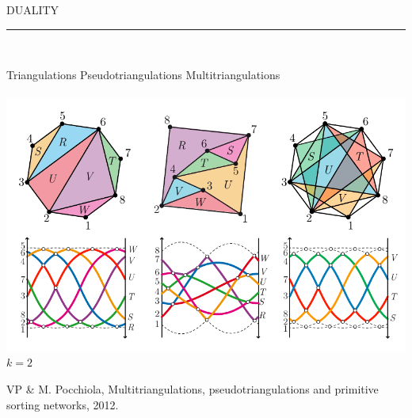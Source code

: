 \documentclass[12pt,titlepage,landscape,a4paper]{article}
\newcommand{\textemoyen}{\fontsize{23}{27}\selectfont}
\newenvironment{slide}[1]
{
\newpage
\begin{center}
{\blue \textemoyen \uppercase{#1}}\\
\end{center}
\vspace{-1cm}
\rule{\textwidth}{0.5 pt}\\
\vspace{-.8cm}
}
{\vspace*{-3cm}}
\newcommand{\violet}{\color{violet}} %
\newcommand{\blue}{\color{blue}} %
\newcommand{\papier}[1]{{\violet\fontsize{15}{20}\selectfont #1}} %
\begin{document}
\begin{slide}{Duality}
\hspace{1.6cm} Triangulations \hspace{3.4cm} Pseudotriangulations \hspace{2.5cm} Multitriangulations\\
\vspace{-.5cm}\\
\vspace*{-2cm}
\hspace*{-.6cm}\includegraphics[scale=1.9]{geometricStructures7}
\vspace{-8.5cm} \\ \hspace*{25.7cm} ${k=2}$

\vspace{7.6cm}
\papier{VP \& M. Pocchiola, Multitriangulations, pseudotriangulations and primitive sorting networks, 2012.}

\vspace*{-3cm}
\end{slide}

\end{document}
